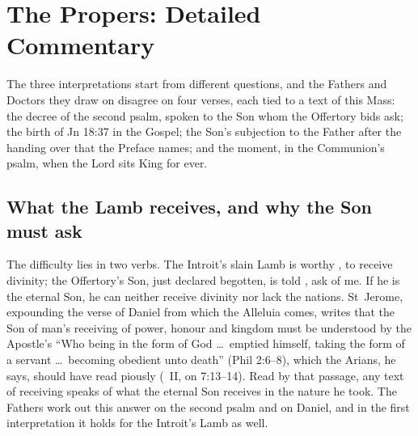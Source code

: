 
\section{The Propers: Detailed Commentary}

The three interpretations start from different questions, and the Fathers
and Doctors they draw on disagree on four verses, each tied to a text of this Mass: the
decree of the second psalm, spoken to the Son whom the Offertory bids ask; the
birth of Jn 18:37 in the Gospel; the Son's subjection to the Father after the
handing over that the Preface names; and the moment, in the Communion's psalm,
when the Lord sits King for ever.

\subsection{What the Lamb receives, and why the Son must ask}

The difficulty lies in two verbs. The Introit's slain Lamb is worthy
, to receive divinity; the Offertory's Son,
just declared begotten, is told , ask of me. If he is the
eternal Son, he can neither receive divinity nor lack the nations. St~Jerome,
expounding the verse of Daniel from which the Alleluia comes, writes that the
Son of man's receiving of power, honour and kingdom must be understood by the
Apostle's ``Who being in the form of God \dots\ emptied himself, taking the
form of a servant \dots\ becoming obedient unto death'' (Phil 2:6--8), which
the Arians, he says, should have read piously (\ II, on
7:13--14). Read by that passage, any text of receiving speaks of what the
eternal Son receives in the nature he took. The Fathers work out this answer on the
second psalm and on Daniel, and in the first interpretation it holds for the
Introit's Lamb as well.


